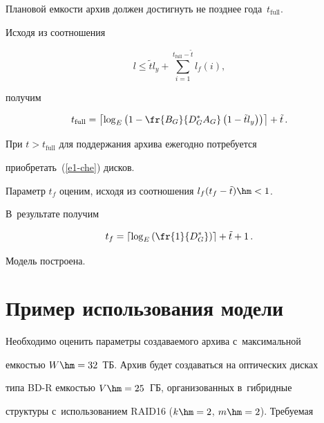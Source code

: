   


  Плановой емкости архив должен достигнуть не позднее года~$t_{\mathrm{full}}$. 


Исходя из соотношения


$$


l\leq \tilde{t} l_y+\sum\limits_{i=1}^{t_{\mathrm{full}}-\tilde{t}} l_f(i),


$$


 получим


  $$


  t_{\mathrm{full}}= \left\lceil \log_E\left( 1-\fr{B_G}{D_G^*A_G}\left( 1-\tilde{t} 


l_y\right)\right)\right\rceil +\tilde{t}\,.


  $$


   


  При $t>t_{\mathrm{full}}$ для поддержания архива ежегодно потребуется 


приобретать~(\ref{e1-che}) дисков.


  


  


  Параметр $t_f$ оценим, исходя из соотношения $l_f(t_f-\tilde{t})\hm<1$. 


В~результате получим 


  $$


  t_f = \left\lceil \log_E \left( \fr{1}{D_G^*}\right)\right\rceil +\tilde{t}+1\,.


  $$


  


  Модель построена.





\section{Пример использования модели}





  Необходимо оценить параметры создаваемого архива с~максимальной 


ем\-костью $W \hm= 32$~ТБ. Архив будет создаваться на оптических дисках 


типа BD-R емкостью $V \hm= 25$~ГБ, организованных в~гибридные 


структуры с~использованием RAID16 ($k\hm = 2$, $m \hm= 2$). Требуемая 


